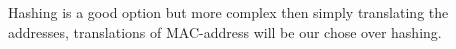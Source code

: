 Hashing is a good option but more complex then simply translating the addresses, translations of MAC-address will be our chose over hashing.


